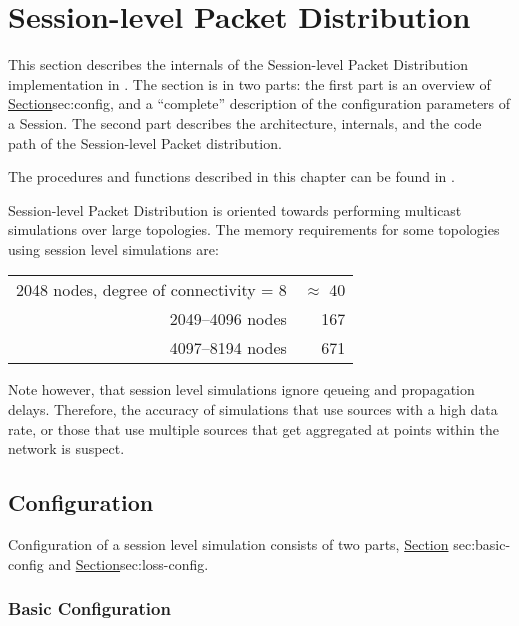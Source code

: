 \chapter{Session-level Packet Distribution}
\label{chap:session}

This section describes the internals of the Session-level Packet Distribution
implementation in \ns.
The section is in two parts:
the first part is an overview of 
\href{Session configuration}{Section}{sec:config},
and a ``complete'' description of the configuration parameters 
of a Session.
The second part describes the architecture, internals, and the code path
of the Session-level Packet distribution.

The procedures and functions described in this chapter can be found in
.

Session-level Packet Distribution is oriented towards
performing multicast simulations over large topologies.
The memory requirements for some topologies using
session level simulations are:

\begin{tabular}{r @{~~~$approx$~} r@{\,MB}}
2048 nodes, degree of connectivity = 8 & $\approx$ 40 \\
2049--4096 nodes & 167 \\
4097--8194 nodes & 671 \\
\end{tabular}

Note however, that session level simulations ignore qeueing and
propagation delays.
Therefore, the accuracy of
simulations that use sources with a high data rate,
or those that use multiple sources that get aggregated at points
within the network is suspect.

\section{Configuration}
\label{sec:config}

Configuration of a session level simulation consists of two parts,
\href{configuration of the session level details themselves}{Section}{%
        sec:basic-config}
and 
\href{adding loss and error models to the session level abstraction
to model specific behaviours}{Section}{sec:loss-config}.

\subsection{Basic Configuration}
\label{sec:basic-config}

